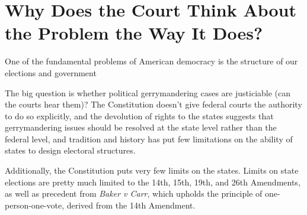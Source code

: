 




\section*{Why Does the Court Think About the Problem the Way It Does?}

One of the fundamental problems of American democracy is the structure of our elections and government

The big question is whether political gerrymandering cases are justiciable (can the courts hear them)? The Constitution doesn't give federal courts the authority to do so explicitly, and the devolution of rights to the states suggests that gerrymandering issues should be resolved at the state level rather than the federal level, and tradition and history has put few limitations on the ability of states to design electoral structures.

Additionally, the Constitution puts very few limits on the states.  Limits on state elections are pretty much limited to the 14th, 15th, 19th, and 26th Amendments, as well as precedent from \textit{Baker v Carr}, which upholds the principle of one-person-one-vote, derived from the 14th Amendment.
